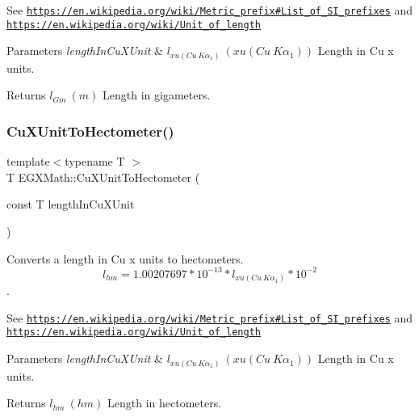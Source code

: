 See \href{https://en.wikipedia.org/wiki/Metric_prefix#List_of_SI_prefixes}{\tt https\+://en.\+wikipedia.\+org/wiki/\+Metric\+\_\+prefix\#\+List\+\_\+of\+\_\+\+S\+I\+\_\+prefixes} and \href{https://en.wikipedia.org/wiki/Unit_of_length}{\tt https\+://en.\+wikipedia.\+org/wiki/\+Unit\+\_\+of\+\_\+length} 
\begin{DoxyParams}{Parameters}
{\em length\+In\+Cu\+X\+Unit} & $ l_{xu(Cu\ K\alpha_1)}\ (xu(Cu\ K\alpha_1))$ Length in Cu x units. \\
\hline
\end{DoxyParams}
\begin{DoxyReturn}{Returns}
$ l_{Gm}\ (m)$ Length in gigameters. 
\end{DoxyReturn}
\mbox{\label{group___e_g_x_math-_conversions-_length_conversions-_non-_s_i-_cu_x_unit-_s_i_ga2174090c2a3f2fefcb6a1e5ac8e2e903}} 
\subsubsection{\texorpdfstring{Cu\+X\+Unit\+To\+Hectometer()}{CuXUnitToHectometer()}}
{\footnotesize\ttfamily template$<$typename T $>$ \\
T E\+G\+X\+Math\+::\+Cu\+X\+Unit\+To\+Hectometer (\begin{DoxyParamCaption}\item[{const T}]{length\+In\+Cu\+X\+Unit }\end{DoxyParamCaption})}



Converts a length in Cu x units to hectometers. \[ l_{hm}=1.00207697*10^{-13} * l_{xu(Cu\ K\alpha_1)} * 10^{-2} \]. 

See \href{https://en.wikipedia.org/wiki/Metric_prefix#List_of_SI_prefixes}{\tt https\+://en.\+wikipedia.\+org/wiki/\+Metric\+\_\+prefix\#\+List\+\_\+of\+\_\+\+S\+I\+\_\+prefixes} and \href{https://en.wikipedia.org/wiki/Unit_of_length}{\tt https\+://en.\+wikipedia.\+org/wiki/\+Unit\+\_\+of\+\_\+length} 
\begin{DoxyParams}{Parameters}
{\em length\+In\+Cu\+X\+Unit} & $ l_{xu(Cu\ K\alpha_1)}\ (xu(Cu\ K\alpha_1))$ Length in Cu x units. \\
\hline
\end{DoxyParams}
\begin{DoxyReturn}{Returns}
$ l_{hm}\ (hm)$ Length in hectometers. 
\end{DoxyReturn}
\mbox{\label{group___e_g_x_math-_conversions-_length_conversions-_non-_s_i-_cu_x_unit-_s_i_ga8a35facc4ac2da0fdda3cfe2bfb22d5c}} 
